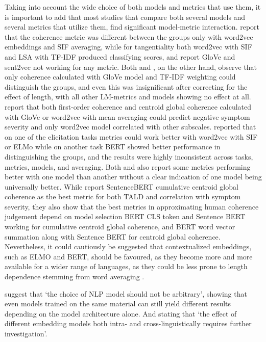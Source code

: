 Taking into account the wide choice of both models and metrics that use them, it is important to add that most studies that compare both several models and several metrics that utilize them, find significant model-metric interaction. \citet{iter2018automatic} report that the coherence metric was different between the groups only with word2vec embeddings and SIF averaging, while for tangentiality both word2vec with SIF and LSA with TF-IDF produced classifying scores, and report GloVe and sent2vec not working for any metric. Both \citet{just2019coherence} and \citet{hitczenko2021understanding}, on the other hand, observe that only coherence calculated with GloVe model and TF-IDF weighting could distinguish the groups, and even this was insignificant after correcting for the effect of length, with all other LM-metrics and models showing no effect at all. \citet{just2023validation} report that both first-order coherence and centroid global coherence calculated with GloVe or word2vec with mean averaging could predict negative symptom severity and only word2vec model correlated with other subscales. \citet{ryazanskaya2020thesis} reported that on one of the elicitation tasks metrics could work better with word2vec with SIF or ELMo while on another task BERT showed better performance in distinguishing the groups, and the results were highly inconsistent across tasks, metrics, models, and averaging. Both \citet{xu2020centroid} and \citet{xu2022fully} also report some metrics performing better with one model than another without a clear indication of one model being universally better. While \citet{xu2022fully} report SentenceBERT cumulative centroid global coherence as the best metric for both TALD and correlation with symptom severity, they also show that the best metrics in approximating human coherence judgement depend on model selection BERT CLS token and Sentence BERT working for cumulative centroid global coherence, and BERT word vector summation along with Sentence BERT for centroid global coherence. Nevertheless, it could cautiously be suggested that contextualized embeddings, such as ELMO and BERT, should be favoured, as they become more and more available for a wider range of languages, as they could be less prone to length dependence stemming from word averaging \citep{fradkin2023theory}.

\citet{just2023validation} suggest that `the choice of NLP model should not be arbitrary', showing that even models trained on the same material can still yield different results depending on the model architecture alone. And stating that `the effect of different embedding models both intra- and cross-linguistically requires further investigation'.

